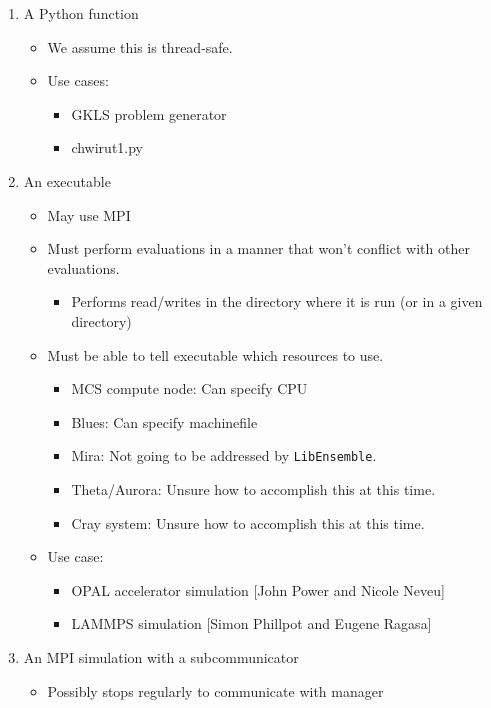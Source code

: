 \documentclass{article}
\newcommand{\libE}{\texttt{LibEnsemble}\xspace}
\begin{document}
\begin{enumerate}
  \item A Python function
    \begin{itemize}
      \item We assume this is thread-safe.
      \item Use cases: 
        \begin{itemize}
          \item GKLS problem generator
          \item chwirut1.py
        \end{itemize}
    \end{itemize}
  \item An executable
    \begin{itemize}
      \item May use MPI
      \item Must perform evaluations in a manner that won't conflict with other evaluations. 
        \begin{itemize}
          \item Performs read/writes in the directory where it is run (or in a given directory)
        \end{itemize}
      \item Must be able to tell executable which resources to use.
        \begin{itemize}
          \item MCS compute node: Can specify CPU
          \item Blues: Can specify machinefile
          \item Mira: Not going to be addressed by \libE.
          \item Theta/Aurora: Unsure how to accomplish this at this time.
          \item Cray system: Unsure how to accomplish this at this time.
        \end{itemize}
      \item Use case: 
        \begin{itemize}
          \item OPAL accelerator simulation [John Power and Nicole Neveu]
          \item LAMMPS simulation [Simon Phillpot and Eugene Ragasa]
        \end{itemize}
    \end{itemize}
  \item An MPI simulation with a subcommunicator
    \begin{itemize}
      \item Possibly stops regularly to communicate with manager

\end{itemize}
\end{enumerate}
\end{document}
